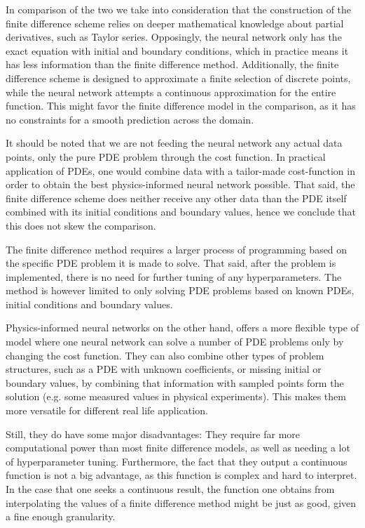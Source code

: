 In comparison of the two we take into consideration that the construction of the finite difference scheme relies on deeper mathematical knowledge about partial derivatives, such as Taylor series.
Opposingly, the neural network only has the exact equation with initial and boundary conditions, which in practice means it has less information than the finite difference method.
Additionally, the finite difference scheme is designed to approximate a finite selection of discrete points, while the neural network attempts a continuous approximation for the entire function. This might favor the finite difference model in the comparison, as it has no constraints for a smooth prediction across the domain. 

It should be noted that we are not feeding the neural network any actual data points, only the pure PDE problem through the cost function.
In practical application of PDEs, one would combine data with a tailor-made cost-function in order to obtain the best physics-informed neural network possible.
That said, the finite difference scheme does neither receive any other data than the PDE itself combined with its initial conditions and boundary values, hence we conclude that this does not skew the comparison.

The finite difference method requires a larger process of programming based on the specific PDE problem it is made to solve.
That said, after the problem is implemented, there is no need for further tuning of any hyperparameters.
The method is however limited to only solving PDE problems based on known PDEs, initial conditions and boundary values.

Physics-informed neural networks on the other hand, offers a more flexible type of model where one neural network can solve a number of PDE problems only by changing the cost function.
They can also combine other types of problem structures, such as a PDE with unknown coefficients, or missing initial or boundary values, by combining that information with sampled points form the solution (e.g. some measured values in physical experiments).
This makes them more versatile for different real life application.

Still, they do have some major disadvantages: They require far more computational power than most finite difference models, as well as needing a lot of hyperparameter tuning.
Furthermore, the fact that they output a continuous function is not a big advantage, as this function is complex and hard to interpret.
In the case that one seeks a continuous result, the function one obtains from interpolating the values of a finite difference method might be just as good, given a fine enough granularity. 
